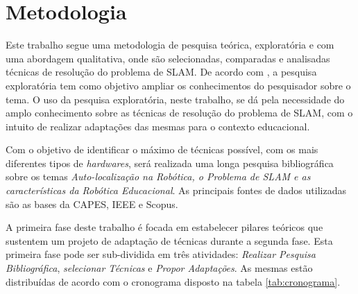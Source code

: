 \chapter[Metodologia]{Metodologia}

Este trabalho segue uma metodologia de pesquisa teórica, exploratória e com uma abordagem qualitativa, onde são selecionadas, comparadas e analisadas técnicas de resolução do problema de SLAM. De acordo com \cite{metodologiaCientifica}, a pesquisa exploratória tem como objetivo ampliar os conhecimentos do pesquisador sobre o tema. O uso da pesquisa exploratória, neste trabalho, se dá pela necessidade do amplo conhecimento sobre as técnicas de resolução do problema de SLAM, com o intuito de realizar adaptações das mesmas para o contexto educacional.

Com o objetivo de identificar o máximo de técnicas possível, com os mais diferentes tipos de \textit{hardwares}, será realizada uma longa pesquisa bibliográfica sobre os temas \textit{Auto-localização na Robótica, o Problema de SLAM e as características da Robótica Educacional}. As principais fontes de dados utilizadas são as bases da CAPES, IEEE e Scopus.

A primeira fase deste trabalho é focada em estabelecer pilares teóricos que sustentem um projeto de adaptação de técnicas durante a segunda fase. Esta primeira fase pode ser sub-dividida em três atividades: \textit{Realizar Pesquisa Bibliográfica}, \textit{selecionar Técnicas} e \textit{Propor Adaptações}. As mesmas estão distribuídas de acordo com o cronograma disposto na tabela \ref{tab:cronograma}.

